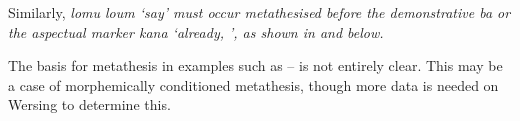 Similarly, \it{lomu} {\ra} \it{loum} `say' must occur
metathesised before the demonstrative \it{ba}
or the aspectual marker \it{kana} `already, ',
as shown in  and  below.

\begin{multicols}{2}
\let\eachwordone=\it
	\begin{exe}
		\label{ex:loum1}
	\end{exe}
\end{multicols}
\begin{multicols}{2}
\let\eachwordone=\it
	\begin{exe}		
		\label{ex:loum2}
	\end{exe}
\end{multicols}

The basis for metathesis in examples such as
-- is not entirely clear.
This may be a case of morphemically conditioned metathesis,
though more data is needed on Wersing to determine this.